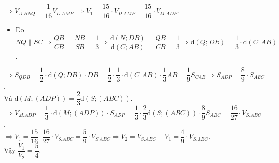 \begin{ex}
{		$\Rightarrow V_{D.BNQ}=\dfrac{1}{16} V_{D.AMP}$
		$\Rightarrow V_1=\dfrac{15}{16} \cdot V_{D.AMP}=\dfrac{15}{16} \cdot V_{M.ADP}$.
		\begin{itemize}
			\item Do $NQ \parallel SC \Rightarrow \dfrac{QB}{CB}=\dfrac{NB}{SB}=\dfrac{1}{3} \Rightarrow \dfrac{\mathrm{d}(N; DB)}{\mathrm{d}(C; AB)}=\dfrac{QB}{CB}=\dfrac{1}{3} \Rightarrow \mathrm{d}(Q;DB)=\dfrac{1}{3}\cdot\mathrm{d}(C;AB)$.
		\end{itemize}
		$\Rightarrow S_{QDB}=\dfrac{1}{2} \cdot \mathrm{d}(Q;DB) \cdot DB=\dfrac{1}{2} \cdot \dfrac{1}{3} \cdot \mathrm{d}(C;AB) \cdot \dfrac{1}{3} AB=\dfrac{1}{9} S_{CAB} \Rightarrow S_{ADP}=\dfrac{8}{9} \cdot S_{ABC}$.\\
		Và $\mathrm{d}(M;(ADP))=\dfrac{2}{3} \mathrm{d}(S;(ABC))$.\\
		$\Rightarrow V_{M.ADP}=\dfrac{1}{3} \cdot \mathrm{d}(M;(ADP)) \cdot S_{ADP}=\dfrac{1}{3} \cdot \dfrac{2}{3} \mathrm{d}(S;(ABC)) \cdot \dfrac{8}{9} S_{ABC}=\dfrac{16}{27} \cdot V_{S.ABC}$.\\
		$\Rightarrow V_1=\dfrac{15}{16} \cdot \dfrac{16}{27} \cdot V_{S.ABC}=\dfrac{5}{9} \cdot V_{S.ABC} \Rightarrow V_2=V_{S.ABC}-V_1=\dfrac{4}{9} \cdot V_{S.ABC}$.\\
		Vậy $\dfrac{V_1}{V_2}=\dfrac{5}{4}$.}
\end{ex}
